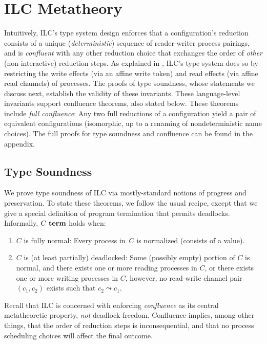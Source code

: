 \section{ILC Metatheory}
\label{sec:metatheory}


Intuitively, ILC's type system design enforces that a
configuration's reduction consists of a unique
(\emph{deterministic}) sequence of reader-writer process pairings,
and is \emph{confluent} with any other reduction choice that exchanges 
the order of \emph{other} (non-interactive) reduction steps.
%
As explained in , ILC's type system does so by restricting the
write effects (via an affine write token) and read effects (via affine read
channels) of processes.
%
The proofs of type soundness, whose statements we discuss next, 
establish the validity of these invariants.
%
These language-level invariants support confluence theorems, also
stated below.
%
These theorems include \emph{full confluence}:
Any two full reductions of a configuration yield a pair of equivalent configurations
(isomorphic, up to a renaming of nondeterministic name choices).
%
The full proofs for type soundness and confluence can be found in the appendix.

\subsection{Type Soundness}

We prove type soundness of ILC via mostly-standard notions of progress
and preservation.
%
To state these theorems, we follow the usual recipe, except that we give a
special definition of program termination that permits deadlocks.
%
Informally, $C~\textbf{term}$ holds when:
\begin{enumerate}[leftmargin=*]
 \item $C$ is fully normal: Every process in~$C$ is normalized (consists of a
   value).
 \item $C$ is (at least partially) deadlocked: 
   Some (possibly empty) portion of $C$ is normal, and there exists one or more
   reading processes in $C$, or there exists one or more writing processes in
   $C$, however, no read-write channel pair~$(c_1,c_2)$ exists such that $c_2 \leadsto
   c_1$.
\end{enumerate}

Recall that ILC is concerned with enforcing \emph{confluence} as its central
metatheoretic property, \emph{not} deadlock freedom.
%
Confluence implies, among other things, that the order of reduction steps is
inconsequential, and that no process scheduling choices will affect
the final outcome.~
%

